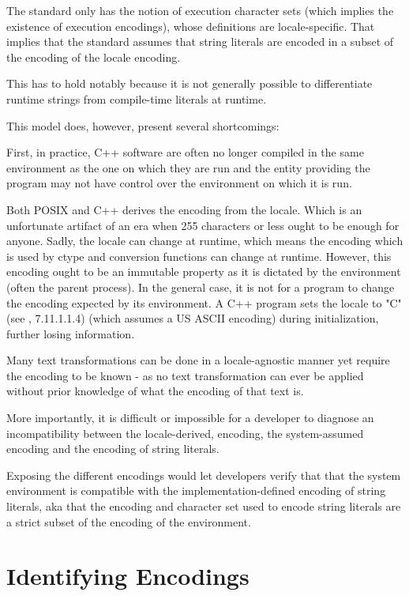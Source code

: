 \documentclass{wg21}
\begin{document}
The standard only has the notion of execution character sets (which implies the existence of execution encodings), whose definitions are locale-specific.
That implies that the standard assumes that string literals are encoded in a subset of the encoding of the locale encoding.

This has to hold notably because it is not generally possible to differentiate runtime strings from compile-time literals at runtime.

This model does, however, present several shortcomings:

First, in practice, C++ software are often no longer compiled in the same environment as the one on which they are run and the entity providing the program may not have control over the environment on which it is run.

Both POSIX and C++ derives the encoding from the locale. Which is an unfortunate artifact of an era when 255 characters or less ought to be enough for anyone.
Sadly, the locale can change at runtime, which means the encoding which is used by ctype and conversion functions can change at runtime.
However, this encoding ought to be an immutable property as it is dictated by the environment (often the parent process).
In the general case, it is not for a program to change the encoding expected by its environment.
A C++ program sets the locale to "C" (see \cite{N2346}, 7.11.1.1.4) (which assumes a US ASCII encoding) during initialization, further losing information.


Many text transformations can be done in a locale-agnostic manner yet require the encoding to be known - as no text transformation can ever be applied without
prior knowledge of what the encoding of that text is.

More importantly, it is difficult or impossible for a developer to diagnose an incompatibility between the locale-derived, encoding, the system-assumed encoding and
the encoding of string literals.

Exposing the different encodings would let developers verify that that the system environment is compatible with the implementation-defined encoding of string literals, aka that the encoding and character set used to encode string literals are a strict subset of the encoding of the environment.

\section{Identifying Encodings}
\end{document}
